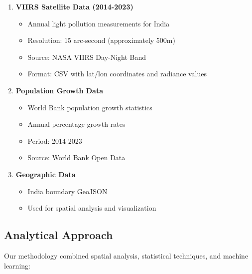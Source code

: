 \documentclass[12pt,a4paper]{article}
\begin{document}
\begin{enumerate}
    \item \textbf{VIIRS Satellite Data (2014-2023)}
    \begin{itemize}
        \item Annual light pollution measurements for India
        \item Resolution: 15 arc-second (approximately 500m)
        \item Source: NASA VIIRS Day-Night Band
        \item Format: CSV with lat/lon coordinates and radiance values
    \end{itemize}
    
    \item \textbf{Population Growth Data}
    \begin{itemize}
        \item World Bank population growth statistics
        \item Annual percentage growth rates
        \item Period: 2014-2023
        \item Source: World Bank Open Data
    \end{itemize}
    
    \item \textbf{Geographic Data}
    \begin{itemize}
        \item India boundary GeoJSON
        \item Used for spatial analysis and visualization
    \end{itemize}
\end{enumerate}

\subsection{Analytical Approach}
Our methodology combined spatial analysis, statistical techniques, and machine learning:
\end{document}
